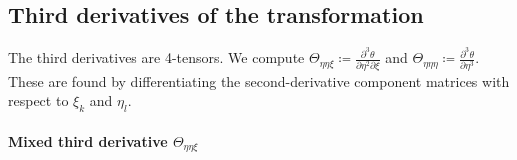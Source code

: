 \documentclass{article}
\begin{document}
\subsection{Third derivatives of the transformation}

The third derivatives are 4-tensors.
We compute $\Theta_{\eta\eta\xi} \coloneqq \frac{\partial^3 \theta}{\partial \eta^2 \partial \xi}$ and $\Theta_{\eta\eta\eta} \coloneqq \frac{\partial^3 \theta}{\partial \eta^3}$.
These are found by differentiating the second-derivative component matrices with respect to $\xi_k$ and $\eta_l$.

\paragraph{Mixed third derivative $\Theta_{\eta\eta\xi}$}
\end{document}
